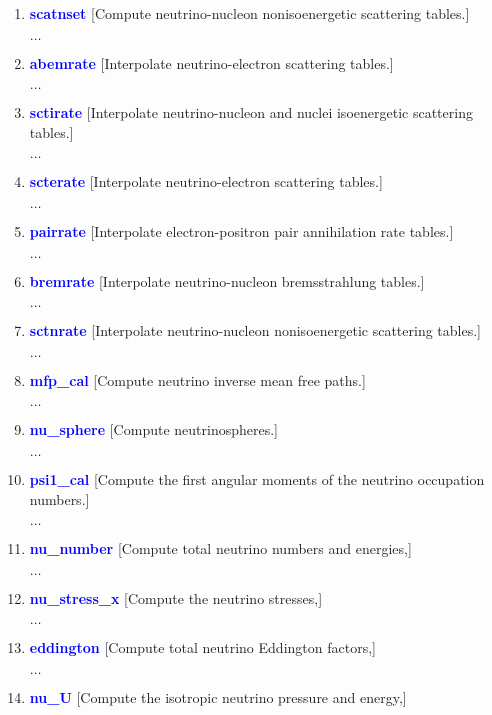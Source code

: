 \documentclass[11pt,doublespace]{article}
\begin{document}
\begin{itemize}
\begin{enumerate}
\begin{enumerate}
\begin{enumerate}
{\begin{enumerate}
  $\ldots$ \item \textcolor{blue}{ {\bf scatnset} }
  [Compute neutrino-nucleon nonisoenergetic scattering tables.]

  $\ldots$ \item \textcolor{blue}{ {\bf abemrate} }
  [Interpolate neutrino-electron scattering tables.]

  $\ldots$ \item \textcolor{blue}{ {\bf sctirate} }
  [Interpolate neutrino-nucleon and nuclei isoenergetic scattering tables.]

  $\ldots$ \item \textcolor{blue}{ {\bf scterate} }
  [Interpolate neutrino-electron scattering tables.]

  $\ldots$ \item \textcolor{blue}{ {\bf pairrate} }
  [Interpolate electron-positron pair annihilation rate tables.]

  $\ldots$ \item \textcolor{blue}{ {\bf bremrate} }
  [Interpolate neutrino-nucleon bremsstrahlung tables.]

  $\ldots$ \item \textcolor{blue}{ {\bf sctnrate} }
  [Interpolate neutrino-nucleon nonisoenergetic scattering tables.]

  $\ldots$ \item \textcolor{blue}{ {\bf mfp\_cal} }
  [Compute neutrino inverse mean free paths.]

  $\ldots$ \item \textcolor{blue}{ {\bf nu\_sphere} }
  [Compute neutrinospheres.]

  $\ldots$ \item \textcolor{blue}{ {\bf psi1\_cal} }
  [Compute the first angular moments of the neutrino occupation numbers.]

  $\ldots$ \item \textcolor{blue}{ {\bf nu\_number} }
  [Compute total neutrino numbers and energies,]

  $\ldots$ \item \textcolor{blue}{ {\bf nu\_stress\_x} }
  [Compute the neutrino stresses,]

  $\ldots$ \item \textcolor{blue}{ {\bf eddington} }
  [Compute total neutrino Eddington factors,]

  $\ldots$ \item \textcolor{blue}{ {\bf nu\_U} }
  [Compute the isotropic neutrino pressure and energy,]


\end{enumerate}}
\end{enumerate}
\end{enumerate}
\end{enumerate}
\end{itemize}
\end{document}

